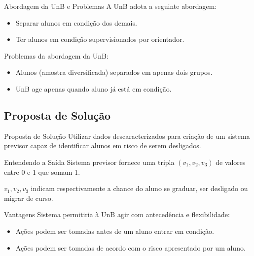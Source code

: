 \begin{frame}{Abordagem da UnB e Problemas}
    A UnB adota a seguinte abordagem: 
    \begin{itemize}
        \item Separar alunos em condição dos demais.
        \item Ter alunos em condição supervisionados por orientador. 
    \end{itemize}

    \vspace{0.5cm}

    Problemas da abordagem da UnB: 
    \begin{itemize}
        \item Alunos (amostra diversificada) separados em apenas dois grupos.
        \item UnB age apenas quando aluno já está em condição.
    \end{itemize}
\end{frame}

\subsection{Proposta de Solução}
\begin{frame}{Proposta de Solução}
    Utilizar dados descaracterizados para criação de um sistema previsor capaz de 
    identificar alunos em risco de serem desligados. 
\end{frame}

\begin{frame}{Entendendo a Saída}
    Sistema previsor fornece uma tripla $(v_1, v_2, v_3)$ de valores entre 0 e 1 que
    somam 1. 

    \vspace{0.5cm}

    $v_1, v_2, v_3$ indicam respectivamente a chance do aluno se graduar, ser
    desligado ou migrar de curso. 
\end{frame}

\begin{frame}{Vantagens}
    Sistema permitiria à UnB agir com antecedência e flexibilidade: 
    \begin{itemize}
        \item Ações podem ser tomadas antes de um aluno entrar em condição. 
        \item Ações podem ser tomadas de acordo com o risco apresentado por um aluno.
    \end{itemize}
\end{frame}

